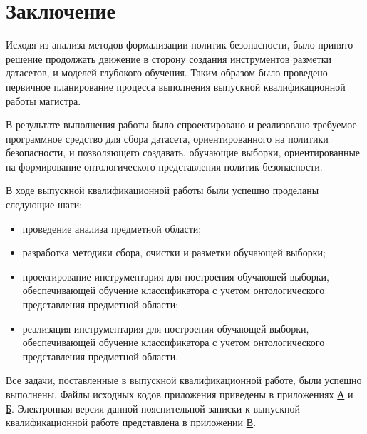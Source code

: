 \documentclass[../main]{subfiles}
\begin{document}
\newpage
{}
{}
\section*{Заключение}

Исходя из анализа методов формализации политик безопасности, было принято решение продолжать движение в сторону создания инструментов разметки датасетов, и моделей глубокого обучения. Таким образом было проведено первичное планирование процесса выполнения выпускной квалификационной работы магистра.

В результате выполнения работы было спроектировано и реализовано требуемое программное средство для сбора датасета, ориентированного на политики безопасности, и позволяющего создавать, обучающие выборки, ориентированные на формирование онтологического представления политик безопасности.

В ходе выпускной квалификационной работы были успешно проделаны следующие шаги:

\begin{itemize}
    \item проведение анализа предметной области;
    \item разработка методики сбора, очистки и разметки обучающей выборки;
    \item проектирование инструментария для построения обучающей выборки, обеспечивающей обучение классификатора с учетом онтологического представления предметной области;
    \item реализация  инструментария для построения обучающей выборки, обеспечивающей обучение классификатора с учетом онтологического представления предметной области.
\end{itemize}

Все задачи, поставленные в выпускной квалификационной работе, были успешно выполнены. Файлы исходных кодов приложения приведены в приложениях \hyperref[sec:appendix1]{А} и \hyperref[sec:appendix2]{Б}.  Электронная  версия  данной  пояснительной  записки  к выпускной квалификационной работе представлена в приложении \hyperref[sec:appendix3]{В}.
\end{document}
